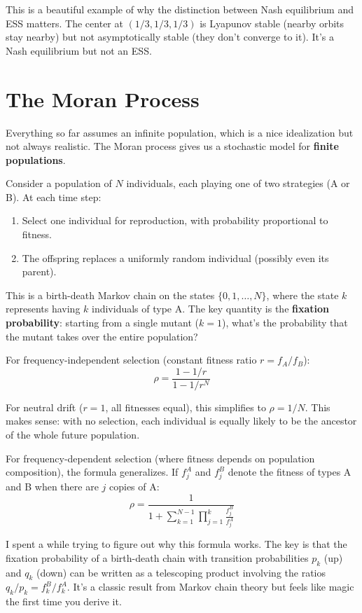 \documentclass[11pt]{article}
\begin{document}
This is a beautiful example of why the distinction between Nash equilibrium and ESS matters. The center at $(1/3, 1/3, 1/3)$ is Lyapunov stable (nearby orbits stay nearby) but not asymptotically stable (they don't converge to it). It's a Nash equilibrium but not an ESS.

\section{The Moran Process}

Everything so far assumes an infinite population, which is a nice idealization but not always realistic. The Moran process gives us a stochastic model for \textbf{finite populations}.

Consider a population of $N$ individuals, each playing one of two strategies (A or B). At each time step:
\begin{enumerate}
    \item Select one individual for reproduction, with probability proportional to fitness.
    \item The offspring replaces a uniformly random individual (possibly even its parent).
\end{enumerate}

This is a birth-death Markov chain on the states $\{0, 1, \ldots, N\}$, where the state $k$ represents having $k$ individuals of type A. The key quantity is the \textbf{fixation probability}: starting from a single mutant ($k=1$), what's the probability that the mutant takes over the entire population?

For frequency-independent selection (constant fitness ratio $r = f_A / f_B$):
\begin{equation}
    \rho = \frac{1 - 1/r}{1 - 1/r^N}
\end{equation}

For neutral drift ($r = 1$, all fitnesses equal), this simplifies to $\rho = 1/N$. This makes sense: with no selection, each individual is equally likely to be the ancestor of the whole future population.

For frequency-dependent selection (where fitness depends on population composition), the formula generalizes. If $f_j^A$ and $f_j^B$ denote the fitness of types A and B when there are $j$ copies of A:
\begin{equation}
    \rho = \frac{1}{1 + \sum_{k=1}^{N-1} \prod_{j=1}^{k} \frac{f_j^B}{f_j^A}}
\end{equation}

I spent a while trying to figure out why this formula works. The key is that the fixation probability of a birth-death chain with transition probabilities $p_k$ (up) and $q_k$ (down) can be written as a telescoping product involving the ratios $q_k / p_k = f_k^B / f_k^A$. It's a classic result from Markov chain theory but feels like magic the first time you derive it.
\end{document}
